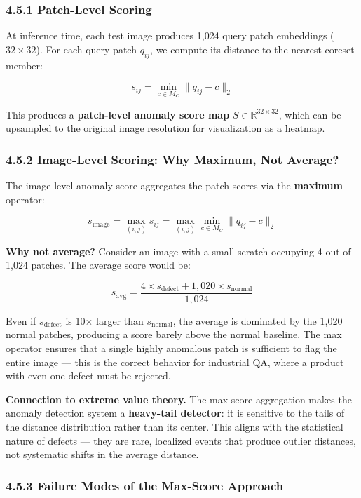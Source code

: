 \documentclass[12pt, a4paper, oneside]{report}
\begin{document}
\subsubsection{4.5.1 Patch-Level Scoring}\label{patch-level-scoring}

At inference time, each test image produces 1,024 query patch embeddings (\(32 \times 32\)). For each query patch \(q_{ij}\), we compute its distance to the nearest coreset member:

\[s_{ij} = \min_{c \in M_C} \|q_{ij} - c\|_2\]

This produces a \textbf{patch-level anomaly score map} \(S \in \mathbb{R}^{32 \times 32}\), which can be upsampled to the original image resolution for visualization as a heatmap.

\subsubsection{4.5.2 Image-Level Scoring: Why Maximum, Not Average?}\label{image-level-scoring-why-maximum-not-average}

The image-level anomaly score aggregates the patch scores via the \textbf{maximum} operator:

\[s_{\text{image}} = \max_{(i,j)} s_{ij} = \max_{(i,j)} \min_{c \in M_C} \|q_{ij} - c\|_2\]

\textbf{Why not average?} Consider an image with a small scratch occupying 4 out of 1,024 patches. The average score would be:

\[s_{\text{avg}} = \frac{4 \times s_{\text{defect}} + 1{,}020 \times s_{\text{normal}}}{1{,}024}\]

Even if \(s_{\text{defect}}\) is 10$\times$ larger than \(s_{\text{normal}}\), the average is dominated by the 1,020 normal patches, producing a score barely above the normal baseline. The max operator ensures that a single highly anomalous patch is sufficient to flag the entire image --- this is the correct behavior for industrial QA, where a product with even one defect must be rejected.

\textbf{Connection to extreme value theory.} The max-score aggregation makes the anomaly detection system a \textbf{heavy-tail detector}: it is sensitive to the tails of the distance distribution rather than its center. This aligns with the statistical nature of defects --- they are rare, localized events that produce outlier distances, not systematic shifts in the average distance.

\subsubsection{4.5.3 Failure Modes of the Max-Score Approach}\label{failure-modes-of-the-max-score-approach}
\end{document}
